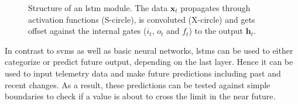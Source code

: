 	\begin{figure}[htb]
	\centering
	
	\caption{Structure of an \ac{lstm} module. The data $\mathbf{x}_t$ propagates through activation functions (S-circle), is convoluted (X-circle) and gets offset against the internal gates ($i_t$, $o_t$ and $f_t$) to the output $\mathbf{h}_t$.}
	\label{f:lstm}
	\end{figure}

	In contrast to \acp{svm} as well as basic neural networks, \acp{lstm} can be used to either categorize or predict future output, depending on the last layer. Hence it can be used to input telemetry data and make future predictions including past and recent changes. As a result, these predictions can be tested against simple boundaries to check if a value is about to cross the limit in the near future.